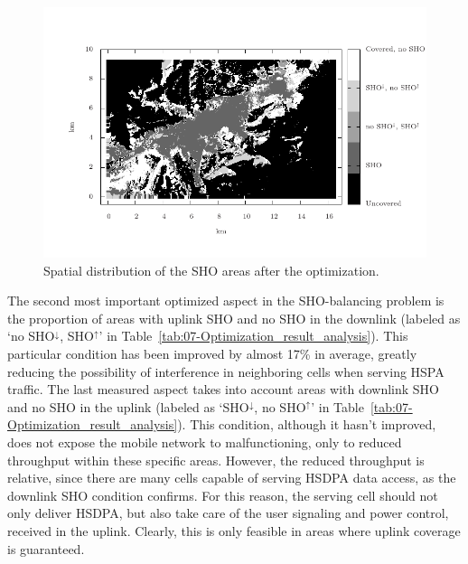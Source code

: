 \begin{figure}[H]
\centering

\includegraphics[width=1\textwidth]{07-experimental_evaluation-sho_balancing/img/sho_areas_final}

\caption{Spatial distribution of the SHO areas after the optimization.\label{fig:07-SHO_areas_final}}
\end{figure}


The second most important optimized aspect in the SHO-balancing problem
is the proportion of areas with uplink SHO and no SHO in the downlink
(labeled as `no SHO$^{\downarrow}$, SHO$^{\uparrow}$' in Table~\ref{tab:07-Optimization_result_analysis}).
This particular condition has been improved by almost 17\% in average,
greatly reducing the possibility of interference in neighboring cells
when serving HSPA traffic. The last measured aspect takes into account
areas with downlink SHO and no SHO in the uplink (labeled as `SHO$^{\downarrow}$,
no SHO$^{\uparrow}$' in Table~\ref{tab:07-Optimization_result_analysis}).
This condition, although it hasn't improved, does not expose the mobile
network to malfunctioning, only to reduced throughput within these
specific areas. However, the reduced throughput is relative, since
there are many cells capable of serving HSDPA data access, as the
downlink SHO condition confirms. For this reason, the serving cell
should not only deliver HSDPA, but also take care of the user signaling
and power control, received in the uplink. Clearly, this is only feasible
in areas where uplink coverage is guaranteed.

